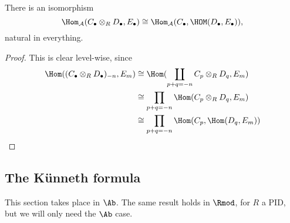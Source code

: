 \documentclass[main.tex]{subfiles}
\begin{document}
\begin{theorem}
  There is an isomorphism
  \begin{equation*}
    \Hom_{\mathcal{A}}(C_{\bullet} \otimes_{R} D_{\bullet}, E_{\bullet}) \cong \Hom_{\mathcal{A}}(C_{\bullet}, \HOM(D_{\bullet}, E_{\bullet})),
  \end{equation*}
  natural in everything.
\end{theorem}
\begin{proof}
  This is clear level-wise, since
  \begin{align*}
    \Hom((C_{\bullet} \otimes_{R} D_{\bullet})_{-n}, E_{m}) &\cong \Hom(\coprod_{p + q = -n}C_{p} \otimes_{R} D_{q}, E_{m}) \\
    &\cong \prod_{p+q=-n} \Hom(C_{p} \otimes_{R} D_{q}, E_{m}) \\
    &\cong \prod_{p+q=-n} \Hom(C_{p}, \Hom(D_{q}, E_{m})) \\
  \end{align*}
\end{proof}

\subsection{The Künneth formula}
\label{ssc:the_kunneth_formula}

This section takes place in $\Ab$. The same result holds in $\Rmod$, for $R$ a PID, but we will only need the $\Ab$ case.
\end{document}
